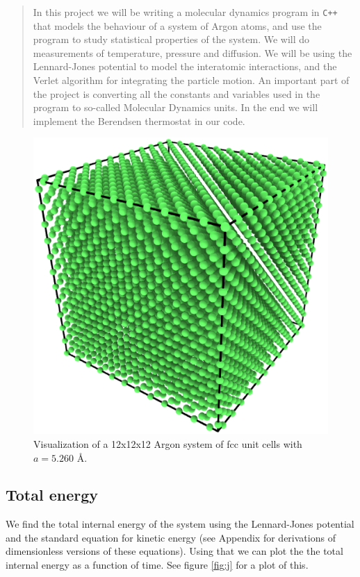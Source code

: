 \begin{abstract}
In this project we will be writing a molecular dynamics program in \texttt{C++} that models the behaviour of a system of Argon atoms, and use the program to study statistical properties of the system. We will do measurements of temperature, pressure and diffusion. We will be using the Lennard-Jones potential to model the interatomic interactions, and the Verlet algorithm for integrating the particle motion. An important part of the project is converting all the constants and variables used in the program to so-called Molecular Dynamics units. In the end we will implement the Berendsen thermostat in our code.
\end{abstract}

\begin{figure}[ht!]
    \centering
    \includegraphics[width =.80\textwidth]{bilder/fcc.eps}
    \parbox{4in} {
        \caption{
            \small{
                Visualization of a 12x12x12 Argon system of fcc unit cells with $a = 5.260$ \AA.
            }
            \label{fig:fcc}
        }
    }
\end{figure}

\subsection*{Total energy}
We find the total internal energy of the system using the Lennard-Jones potential and the standard equation for kinetic energy (see Appendix for derivations of dimensionless versions of these equations). Using that we can plot the the total internal energy as a function of time. See figure \ref{fig:j} for a plot of this.

